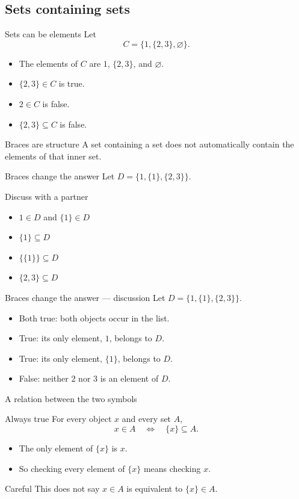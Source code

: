 \documentclass{beamer}
\begin{document}
\subsection{Sets containing sets}
\begin{frame}{Sets can be elements}
Let\[C=\{1,\{2,3\},\varnothing\}.\]\begin{itemize}
\item The elements of $C$ are $1$, $\{2,3\}$, and $\varnothing$.
\item $\{2,3\}\in C$ is true.
\item $2\in C$ is false.
\item $\{2,3\}\subseteq C$ is false.
\end{itemize}\begin{block}{Braces are structure}
A set containing a set does not automatically contain the elements of that inner set.
\end{block}
\end{frame}
\begin{frame}{Braces change the answer}
Let $D=\{1,\{1\},\{2,3\}\}$.
\begin{block}{Discuss with a partner}
\begin{itemize}
\item $1\in D$ and $\{1\}\in D$
\item $\{1\}\subseteq D$
\item $\{\{1\}\}\subseteq D$
\item $\{2,3\}\subseteq D$
\end{itemize}
\end{block}
\end{frame}
\begin{frame}{Braces change the answer --- discussion}
Let $D=\{1,\{1\},\{2,3\}\}$.
\begin{itemize}
\item Both true: both objects occur in the list.
\item True: its only element, $1$, belongs to $D$.
\item True: its only element, $\{1\}$, belongs to $D$.
\item False: neither $2$ nor $3$ is an element of $D$.
\end{itemize}
\end{frame}
\begin{frame}{A relation between the two symbols}
\begin{block}{Always true}
For every object $x$ and every set $A$,\[x\in A\quad\Longleftrightarrow\quad\{x\}\subseteq A.\]
\end{block}\begin{itemize}
\item The only element of $\{x\}$ is $x$.
\item So checking every element of $\{x\}$ means checking $x$.
\end{itemize}\begin{block}{Careful}
This does not say $x\in A$ is equivalent to $\{x\}\in A$.
\end{block}
\end{frame}
\end{document}
